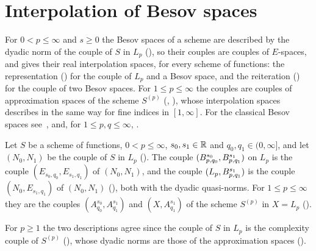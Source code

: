\section{Interpolation of Besov spaces}
\label{sec:besov-interpolation}

For $0 < p \leq \infty$ and $s \geq 0$ the Besov spaces of a scheme are described by the dyadic
norm of the couple of $S$ in $L_p$ (), so their couples are couples of
$E$-spaces, and  gives their real interpolation spaces, for every
scheme of functions: the representation () for the couple of
$L_p$ and a Besov space, and the reiteration () for the couple
of two Besov spaces. For $1 \leq p \leq \infty$ the couples are couples of approximation spaces
of the scheme $S^{(p)}$ (, ), whose
interpolation spaces  describes in the same way for
fine indices in $[1, \infty]$. For the classical Besov spaces see~\cite{DeVorePopovTAMS},
\cite[\S 4.6]{DeVore1998} and, for $1 \leq p, q \leq \infty$,
\cite[Theorem~6.4.5]{BerghLofstrom}.

\begin{definition}
\label{def:besov-couples}
\leanok
{}
Let $S$ be a scheme of functions, $0 < p \leq \infty$, $s_0, s_1 \in \mathbb{R}$ and
$q_0, q_1 \in (0, \infty]$, and let $(N_0, N_1)$ be the couple of $S$ in $L_p$
(). The couple $(B^{s_0}_{p,q_0}, B^{s_1}_{p,q_1})$ on $L_p$
is the couple $(E_{s_0, q_0}, E_{s_1, q_1})$ of $(N_0, N_1)$, and the couple
$(L_p, B^{s_1}_{p,q_1})$ is the couple $(N_0, E_{s_1, q_1})$ of $(N_0, N_1)$
(), both with the dyadic quasi-norms. For $1 \leq p \leq \infty$ they are
the couples $(A^{s_0}_{q_0}, A^{s_1}_{q_1})$ and $(X, A^{s_1}_{q_1})$ of the scheme $S^{(p)}$
in $X = L_p$ ().
\end{definition}

For $p \geq 1$ the two descriptions agree since the couple of $S$ in $L_p$ is the complexity
couple of $S^{(p)}$ (), whose dyadic norms are those of the
approximation spaces ().

